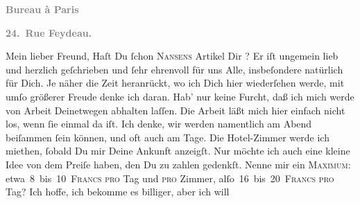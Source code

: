 \begin{ledgroupsized}[t]{13cm}
           \pstart
           \begin{otherlanguage}{french}\textcolor{gray}{\textbf{\textbf{Bureau à Paris}}}\end{otherlanguage}\pend
           \pstart
           \begin{otherlanguage}{french}\textcolor{gray}{\textbf{\textbf{24. Rue Feydeau.}}}\end{otherlanguage}\pend
           \pstart\center{}Mein lieber Freund,\pend\pstart
           Haſt Du ſchon \textsc{Nansens}{ }Artikel Dir \label{K_L02806-1v}\label{K_L02806-1h}? Er iſt ungemein lieb und herzlich geſchrieben und ſehr ehrenvoll für uns
               Alle, insbeſondere natürlich für Dich.\pend
           \pstart
           Je näher die Zeit heranrückt, wo ich Dich hier wiederſehen werde, mit umſo größerer
               Freude denke ich daran. Hab’ nur keine Furcht, daß ich mich werde von Arbeit
               Deinetwegen abhalten laſſen. Die Arbeit läßt mich hier einfach nicht los, wenn ſie
               einmal da iſt. Ich denke, wir werden namentlich am Abend beiſammen ſein können, und oft auch am Tage. {\pb} Die Hotel-Zimmer werde ich miethen, ſobald Du mir
               Deine Ankunft anzeigſt. Nur möchte ich auch eine kleine Idee von dem Preiſe haben,
               den Du zu zahlen gedenkſt. \strikeout{\textcolor{gray}{Nenne}} Nenne mir ein \textsc{Maximum}: etwa 8 bis 10 \textsc{Francs}{ }\textsc{pro} Tag und \textsc{pro} Zimmer,
                  alſo 16 bis 20 \textsc{Francs}{ }\textsc{pro} Tag? Ich hoffe, ich bekomme es billiger, aber ich will

\end{ledgroupsized}

